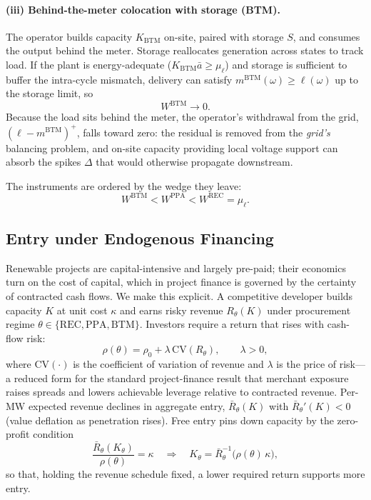 \documentclass[a4paper,fleqn,longmktitle]{cas-sc}
\theoremstyle{plain}
\theoremstyle{definition}
\newcommand{\pos}[1]{\left(#1\right)^{+}}
\newcommand{\REC}{\mathrm{REC}}
\newcommand{\PPA}{\mathrm{PPA}}
\newcommand{\BTM}{\mathrm{BTM}}
\begin{document}
\paragraph{(iii) Behind-the-meter colocation with storage (BTM).} The operator builds capacity $K_{\BTM}$ on-site, paired with storage $S$, and consumes the output behind the meter. Storage reallocates generation across states to track load. If the plant is energy-adequate ($K_{\BTM}\bar a\ge\mu_\ell$) and storage is sufficient to buffer the intra-cycle mismatch, delivery can satisfy $m^{\BTM}(\omega)\ge\ell(\omega)$ up to the storage limit, so
\begin{equation}
    W^{\BTM}\to 0.
\end{equation}
Because the load sits behind the meter, the operator's withdrawal from the grid, $\pos{\ell-m^{\BTM}}$, falls toward zero: the residual is removed from the \emph{grid's} balancing problem, and on-site capacity providing local voltage support can absorb the spikes $\Delta$ that would otherwise propagate downstream.

The instruments are ordered by the wedge they leave:
\begin{equation}
    W^{\BTM}<W^{\PPA}<W^{\REC}=\mu_\ell.
    \label{eq:wedge-order}
\end{equation}

\subsection{Entry under Endogenous Financing}\label{subsec:entry}

Renewable projects are capital-intensive and largely pre-paid; their economics turn on the cost of capital, which in project finance is governed by the certainty of contracted cash flows. We make this explicit. A competitive developer builds capacity $K$ at unit cost $\kappa$ and earns risky revenue $R_\theta(K)$ under procurement regime $\theta\in\{\REC,\PPA,\BTM\}$. Investors require a return that rises with cash-flow risk:
\begin{equation}
    \rho(\theta)=\rho_0+\lambda\,\mathrm{CV}\!\left(R_\theta\right),\qquad \lambda>0,
    \label{eq:cost-of-capital}
\end{equation}
where $\mathrm{CV}(\cdot)$ is the coefficient of variation of revenue and $\lambda$ is the price of risk---a reduced form for the standard project-finance result that merchant exposure raises spreads and lowers achievable leverage relative to contracted revenue. Per-MW expected revenue declines in aggregate entry, $\bar R_\theta(K)$ with $\bar R_\theta'(K)<0$ (value deflation as penetration rises). Free entry pins down capacity by the zero-profit condition
\begin{equation}
    \frac{\bar R_\theta(K_\theta)}{\rho(\theta)}=\kappa
    \quad\Longrightarrow\quad
    K_\theta=\bar R_\theta^{-1}\!\big(\rho(\theta)\,\kappa\big),
    \label{eq:entry}
\end{equation}
so that, holding the revenue schedule fixed, a lower required return supports more entry.
\end{document}
